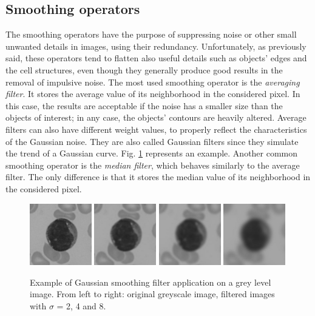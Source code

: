 \subsection{Smoothing operators} %
The smoothing operators have the purpose of suppressing noise or other small unwanted details in images, using their redundancy. Unfortunately, as previously said, these operators tend to flatten also useful details such as objects' edges and the cell structures, even though they generally produce good results in the removal of impulsive noise. The most used smoothing operator is the \textit{averaging filter}. It stores the average value of its neighborhood in the considered pixel. In this case, the results are acceptable if the noise has a smaller size than the objects of interest; in any case, the objects' contours are heavily altered. Average filters can also have different weight values, to properly reflect the characteristics of the Gaussian noise. They are also called Gaussian filters since they simulate the trend of a Gaussian curve. Fig. \ref{fig:smoothing} represents an example. Another common smoothing operator is the \textit{median filter}, which behaves similarly to the average filter. The only difference is that it stores the median value of its neighborhood in the considered pixel.

\begin{figure}[!h]
	\centering
	\includegraphics[width=0.24\textwidth]{images/smooth0}
	\includegraphics[width=0.24\textwidth]{images/smooth1}
	\includegraphics[width=0.24\textwidth]{images/smooth2}
	\includegraphics[width=0.24\textwidth]{images/smooth3}
	\caption[Example of Gaussian smoothing filter.]{\label{fig:smoothing}Example of Gaussian smoothing filter application on a grey level image. From left to right: original greyscale image, filtered images with $\sigma$ = 2, 4 and 8.}
\end{figure}

